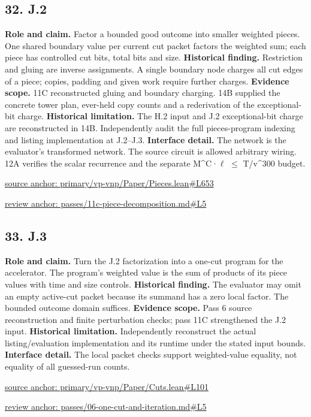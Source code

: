 \documentclass[11pt,letterpaper]{article}
\theoremstyle{definition}\newtheorem{definition}[theorem]{Definition}\newtheorem{example}[theorem]{Example}
\theoremstyle{remark}\newtheorem{remark}[theorem]{Remark}
\begin{document}
\subsection*{32. J.2}
\textbf{Role and claim.} Factor a bounded good outcome into smaller weighted pieces. One shared boundary value per current cut packet factors the weighted sum; each piece has controlled cut bits, total bits and size.
\textbf{Historical finding.} Restriction and gluing are inverse assignments. A single boundary node charges all cut edges of a piece; copies, padding and given work require further charges.
\textbf{Evidence scope.} 11C reconstructed gluing and boundary charging. 14B supplied the concrete tower plan, ever-held copy counts and a rederivation of the exceptional-bit charge.
\textbf{Historical limitation.} The H.2 input and J.2 exceptional-bit charge are reconstructed in 14B. Independently audit the full pieces-program indexing and listing implementation at J.2–J.3.
\textbf{Interface detail.} The network is the evaluator's transformed network. The source circuit is allowed arbitrary wiring. 12A verifies the scalar recurrence and the separate M\textasciicircum{}C·\ensuremath{\ell} \ensuremath{\le} T/v\textasciicircum{}300 budget.
\par\href{https://github.com/nousentllc/VP-VNP-Review/blob/8a7976933b6b2b4ffda1ad3a0dfb5fc6b6f023e8/primary/vp-vnp/Paper/Pieces.lean\#L653}{source anchor: primary/vp-vnp/Paper/Pieces.lean\#L653}
\par\href{https://github.com/nousentllc/VP-VNP-Review/blob/8a7976933b6b2b4ffda1ad3a0dfb5fc6b6f023e8/passes/11c-piece-decomposition.md\#L5}{review anchor: passes/11c-piece-decomposition.md\#L5}
\goodbreak
{}
\hypertarget{claim.33}{}
\subsection*{33. J.3}
\textbf{Role and claim.} Turn the J.2 factorization into a one-cut program for the accelerator. The program's weighted value is the sum of products of its piece values with time and size controls.
\textbf{Historical finding.} The evaluator may omit an empty active-cut packet because its summand has a zero local factor. The bounded outcome domain suffices.
\textbf{Evidence scope.} Pass 6 source reconstruction and finite perturbation checks; pass 11C strengthened the J.2 input.
\textbf{Historical limitation.} Independently reconstruct the actual listing/evaluation implementation and its runtime under the stated input bounds.
\textbf{Interface detail.} The local packet checks support weighted-value equality, not equality of all guessed-run counts.
\par\href{https://github.com/nousentllc/VP-VNP-Review/blob/8a7976933b6b2b4ffda1ad3a0dfb5fc6b6f023e8/primary/vp-vnp/Paper/Cuts.lean\#L101}{source anchor: primary/vp-vnp/Paper/Cuts.lean\#L101}
\par\href{https://github.com/nousentllc/VP-VNP-Review/blob/8a7976933b6b2b4ffda1ad3a0dfb5fc6b6f023e8/passes/06-one-cut-and-iteration.md\#L5}{review anchor: passes/06-one-cut-and-iteration.md\#L5}
\goodbreak
{}
\hypertarget{claim.34}{}
\end{document}
